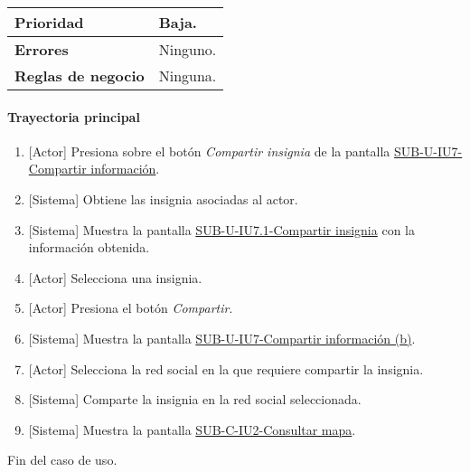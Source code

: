 \begin{longtable}{|J{5cm}|J{10.3cm}|}
		\\ \hline 
	\textbf{Prioridad} & 
		Baja. \\ \hline
	\textbf{Errores} & Ninguno.
		\\ \hline
	\textbf{Reglas de negocio} & Ninguna.
		 \\ \hline
\end{longtable}

\paragraph{Trayectoria principal}
	\begin{enumerate}
		\item {[Actor]} Presiona sobre el botón \textit{Compartir insignia} de la pantalla \hyperref[fig:sub-u-iu7.a]{SUB-U-IU7-Compartir información}.
		\item {[Sistema]} Obtiene las insignia asociadas al actor.
		\item {[Sistema]} Muestra la pantalla \hyperref[fig:sub-u-iu7.1]{SUB-U-IU7.1-Compartir insignia} con la información obtenida.
		\item {[Actor]} Selecciona una insignia.
		\item {[Actor]} Presiona el botón \textit{Compartir}.
		\item \label{SUB-U-CU7.1:Pantalla} {[Sistema]} Muestra la pantalla \hyperref[fig:sub-u-iu7.b]{SUB-U-IU7-Compartir información (b)}.
		\item {[Actor]} Selecciona la red social en la que requiere compartir la insignia.
		\item {[Sistema]} Comparte la insignia en la red social seleccionada.
		\item {[Sistema]} Muestra la pantalla \hyperref[fig:sub-c-iu2]{SUB-C-IU2-Consultar mapa}.
	\end{enumerate}
	Fin del caso de uso.

